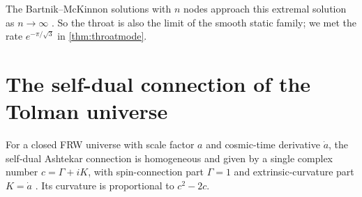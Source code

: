 The Bartnik--McKinnon solutions with $n$ nodes approach this extremal solution as $n\to\infty$ \cite{BFM1994} \ext. So the throat is also the limit of the smooth static family; we met the rate $e^{-\pi/\sqrt3}$ in \cref{thm:throatmode}.

\section{The self-dual connection of the Tolman universe}

For a closed FRW universe with scale factor $a$ and cosmic-time derivative $\dot a$, the self-dual Ashtekar connection is homogeneous and given by a single complex number $c=\Gamma+iK$, with spin-connection part $\Gamma=1$ and extrinsic-curvature part $K=\dot a$ \cite{Ashtekar1986,AshtekarPawlowskiSingh2006}. Its curvature is proportional to $c^2-2c$.

